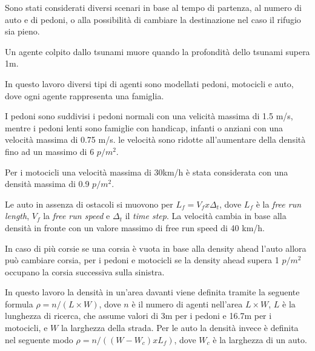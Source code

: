 Sono stati considerati diversi scenari in base al tempo di partenza, al numero di auto e di pedoni,
o alla possibilità di cambiare la destinazione nel caso il rifugio sia pieno.

\vspace*{5mm}

Un agente colpito dallo tsunami muore quando la profondità dello tsunami supera 1m.

\vspace*{5mm}

In questo lavoro diversi tipi di agenti sono modellati pedoni, motocicli e auto,
dove ogni agente rappresenta una famiglia.

\vspace*{5mm}

I pedoni sono suddivisi i pedoni normali con una velicità massima di 1.5 m/s,
mentre i pedoni lenti sono famiglie con handicap, infanti o anziani con una velocità massima di 0.75 m/s.
le velocità sono ridotte all'aumentare della densità fino ad un massimo di 6 $p/m^2$.

\vspace*{5mm}

Per i motocicli una velocità massima di 30km/h è stata considerata con una densità massima di 0.9 $p/m^2$.

\vspace*{5mm}

Le auto in assenza di ostacoli si muovono per $L_{f} = V_{f} x \Delta_{t} $, dove $L_{f}$ è la \textit{free run length},
$V_{f}$ la \textit{free run speed} e $\Delta_{t}$ il \textit{time step}.
La velocità cambia in base alla densità in fronte con un valore massimo di free run speed di 40 km/h.

\vspace*{5mm}

In caso di più corsie se una corsia è vuota in base alla density ahead l'auto allora può cambiare corsia,
per i pedoni e motocicli se la density ahead supera 1 $p/m^2$ occupano la corsia successiva sulla sinistra.

\vspace*{5mm}

In questo lavoro la densità in un'area davanti viene definita tramite la seguente formula
$\rho = n /(L \times W)$, dove $n$ è il numero di agenti nell'area $L \times W$, $L$ è la lunghezza di ricerca, 
che assume valori di 3m per i pedoni e 16.7m per i motocicli, e $W$ la larghezza della strada.
Per le auto la densità invece è definita nel seguente modo $\rho = n /((W - W_{c}) x L_{f})$, dove $W_{c}$ è la larghezza di un auto.

